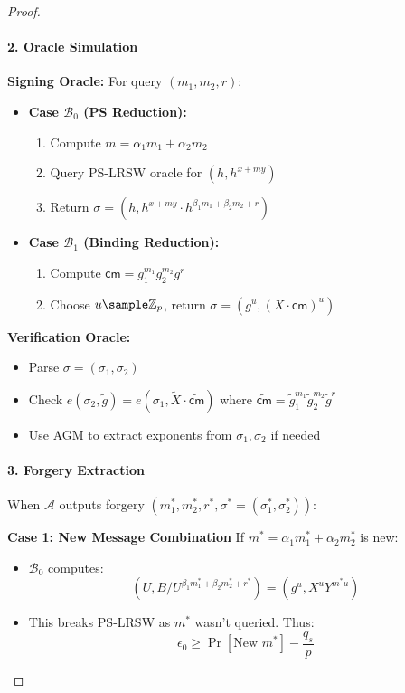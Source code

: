 \begin{proof}
\paragraph{2. Oracle Simulation} \textbf{Signing Oracle:}
For query $(m_1, m_2, r)$:
\begin{itemize}
    \item \textbf{Case $\mathcal{B}_0$ (PS Reduction):}
    \begin{enumerate}
        \item Compute $m = \alpha_1m_1 + \alpha_2m_2$
        \item Query PS-LRSW oracle for $(h, h^{x + my})$
        \item Return $\sigma = (h, h^{x + my} \cdot h^{\beta_1m_1 + \beta_2m_2 + r})$
    \end{enumerate}
    \item \textbf{Case $\mathcal{B}_1$ (Binding Reduction):}
    \begin{enumerate}
        \item Compute $\mathsf{cm} = g_1^{m_1}g_2^{m_2}g^r$
        \item Choose $u \sample \Z_p$, return $\sigma = (g^u, (X \cdot \mathsf{cm})^u)$
    \end{enumerate}
\end{itemize}

\noindent \textbf{Verification Oracle:}

\begin{itemize}
    \item Parse $\sigma = (\sigma_1, \sigma_2)$
    \item Check $e(\sigma_2, \tilde{g}) = e(\sigma_1, \tilde{X} \cdot \widetilde{\mathsf{cm}})$ where $\widetilde{\mathsf{cm}} = \tilde{g}_1^{m_1}\tilde{g}_2^{m_2}\tilde{g}^r$
    \item Use AGM to extract exponents from $\sigma_1, \sigma_2$ if needed
\end{itemize}


\paragraph{3. Forgery Extraction}

When $\mathcal{A}$ outputs forgery $(m_1^*, m_2^*, r^*, \sigma^* = (\sigma_1^*, \sigma_2^*))$:

\noindent \textbf{Case 1: New Message Combination}
If $m^* = \alpha_1m_1^* + \alpha_2m_2^*$ is new:
\begin{itemize}
    \item $\mathcal{B}_0$ computes:
    \[
    (U, B/U^{\beta_1m_1^* + \beta_2m_2^* + r^*}) = (g^u, X^uY^{m^*u})
    \]
    \item This breaks PS-LRSW as $m^*$ wasn't queried. Thus:
    \[
    \epsilon_0 \geq \Pr[\text{New } m^*] - \frac{q_s}{p}
    \]
\end{itemize}


\end{proof}
